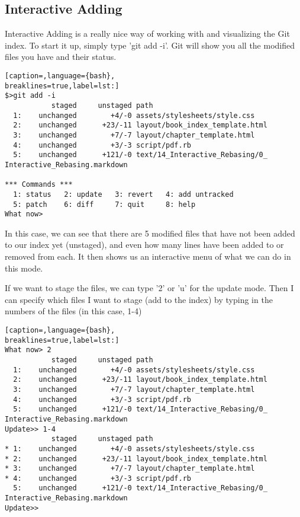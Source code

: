 \subsection{Interactive Adding}
Interactive Adding is a really nice way of working with and visualizing the Git
index. To start it up, simply type 'git add -i'. Git will show you all the
modified files you have and their status.
\lstset{basicstyle=\scriptsize, numbers=none, captionpos=b, tabsize=4}
\begin{lstlisting}[caption=,language={bash},
breaklines=true,label=lst:]
$>git add -i
           staged     unstaged path
  1:    unchanged        +4/-0 assets/stylesheets/style.css
  2:    unchanged      +23/-11 layout/book_index_template.html
  3:    unchanged        +7/-7 layout/chapter_template.html
  4:    unchanged        +3/-3 script/pdf.rb
  5:    unchanged      +121/-0 text/14_Interactive_Rebasing/0_ Interactive_Rebasing.markdown

*** Commands ***
  1: status   2: update   3: revert   4: add untracked
  5: patch    6: diff     7: quit     8: help
What now> 
\end{lstlisting}

In this case, we can see that there are 5 modified files that have not been
added to our index yet (unstaged), and even how many lines have been added to
or removed from each. It then shows us an interactive menu of what we can do in
this mode.

If we want to stage the files, we can type '2' or 'u' for the update mode. Then
I can specify which files I want to stage (add to the index) by typing in the
numbers of the files (in this case, 1-4)
\lstset{basicstyle=\scriptsize, numbers=none, captionpos=b, tabsize=4}
\begin{lstlisting}[caption=,language={bash},
breaklines=true,label=lst:]
What now> 2
           staged     unstaged path
  1:    unchanged        +4/-0 assets/stylesheets/style.css
  2:    unchanged      +23/-11 layout/book_index_template.html
  3:    unchanged        +7/-7 layout/chapter_template.html
  4:    unchanged        +3/-3 script/pdf.rb
  5:    unchanged      +121/-0 text/14_Interactive_Rebasing/0_ Interactive_Rebasing.markdown
Update>> 1-4
           staged     unstaged path
* 1:    unchanged        +4/-0 assets/stylesheets/style.css
* 2:    unchanged      +23/-11 layout/book_index_template.html
* 3:    unchanged        +7/-7 layout/chapter_template.html
* 4:    unchanged        +3/-3 script/pdf.rb
  5:    unchanged      +121/-0 text/14_Interactive_Rebasing/0_ Interactive_Rebasing.markdown
Update>> 
\end{lstlisting}

